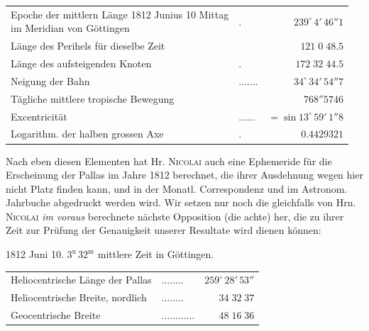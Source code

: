 \begin{center}\fontsize{10}{12}\selectfont\setlength{\tabcolsep}{4pt}\renewcommand{\arraystretch}{1.15}\begin{tabular}{llr}
\shortstack[l]{Epoche der mittlern Länge 1812 Junius 10 Mittag\\im Meridian von Göttingen} & . & $239^\circ\,4'\,46''1$\\
Länge des Perihels für dieselbe Zeit &  & $121\;0\;48.5$\\
Länge des aufsteigenden Knoten & . & $172\;32\;44.5$\\
Neigung der Bahn & .\;.\;.\;.\;.\;.\;. & $34^\circ\,34'\,54''7$\\
Tägliche mittlere tropische Bewegung &  & $768''5746$\\
Excentricität & .\;.\;.\;.\;.\;. & $=\sin13^\circ\,59'\,1''8$\\
Logarithm. der halben grossen Axe & . & $0.4429321$\\
\end{tabular}\end{center}

\par\indent Nach eben diesen Elementen hat Hr. \textsc{Nicolai} auch eine Ephemeride für die Erscheinung der Pallas im Jahre 1812 berechnet, die ihrer Ausdehnung wegen hier nicht Platz finden kann, und in der Monatl. Correspondenz und im Astronom. Jahrbuche abgedruckt werden wird. Wir setzen nur noch die gleichfalls von Hrn. \textsc{Nicolai} \emph{im voraus} berechnete nächste Opposition (die achte) her, die zu ihrer Zeit zur Prüfung der Genauigkeit unserer Resultate wird dienen können:
\begin{center}1812 Juni 10. $3^{\mathrm u}\,32^{\mathrm m}$ mittlere Zeit in Göttingen.\end{center}

\begin{center}\fontsize{10}{12}\selectfont\setlength{\tabcolsep}{4pt}\renewcommand{\arraystretch}{1.15}\begin{tabular}{llr}
Heliocentrische Länge der Pallas & .\;.\;.\;.\;.\;.\;.\;. & $259^\circ\,28'\,53''$\\
Heliocentrische Breite, nordlich & .\;.\;.\;.\;.\;.\;.\;. & $34\;32\;37$\\
Geocentrische Breite & .\;.\;.\;.\;.\;.\;.\;.\;.\;.\;.\;. & $48\;16\;36$\\
\end{tabular}\end{center}

